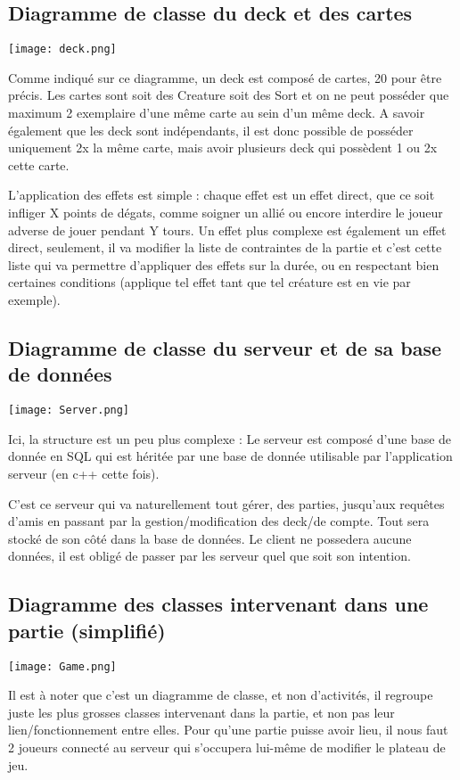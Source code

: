 \documentclass{article}
\begin{document}
		\newpage
		\subsection{Diagramme de classe du \gls{deck} et des cartes}
		\begin{center}\texttt{[image: deck.png]}\end{center}
			Comme indiqué sur ce diagramme, un \gls{deck} est composé de cartes, 20 pour être précis. Les cartes sont soit des \gls{Creature}
			soit des \gls{Sort} et on ne peut posséder que maximum 2 exemplaire d'une même carte au sein d'un même \gls{deck}.
			A savoir également que les \gls{deck} sont indépendants, il est donc possible de posséder uniquement 2x la même carte,
			mais avoir plusieurs \gls{deck} qui possèdent 1 ou 2x cette carte.

			L'application des effets est simple : chaque effet est un effet direct, que ce soit infliger X points de dégats, comme soigner un allié ou encore interdire le joueur adverse de jouer pendant Y tours.
			Un effet plus complexe est également un effet direct, seulement, il va modifier la liste de contraintes de la partie et c'est cette liste qui va permettre d'appliquer des effets sur la durée, ou en respectant bien certaines conditions (applique tel effet tant que tel créature est en vie par exemple).

		\newpage
		\subsection{Diagramme de classe du serveur et de sa base de données}
		\begin{center}\texttt{[image: Server.png]}\end{center}
			Ici, la structure est un peu plus complexe : Le serveur est composé d'une base de donnée en SQL qui est héritée par 
			une base de donnée utilisable par l'application serveur (en c++ cette fois).

			C'est ce serveur qui va naturellement tout gérer, des parties, jusqu'aux requêtes d'amis en passant
			par la gestion/modification des \gls{deck}/de compte. Tout sera stocké de son côté dans la base de données.
			Le client ne possedera aucune données, il est obligé de passer par les serveur quel que soit son intention.

		\newpage
		\subsection{Diagramme des classes intervenant dans une partie (simplifié)}
		\begin{center}\texttt{[image: Game.png]}\end{center}
			Il est à noter que c'est un diagramme de classe, et non d'activités, il regroupe juste les plus grosses classes intervenant dans la partie,
			et non pas leur lien/fonctionnement entre elles.
			Pour qu'une partie puisse avoir lieu, il nous faut 2 joueurs connecté au serveur qui s'occupera lui-même de modifier le plateau de jeu.
			
\end{document}
